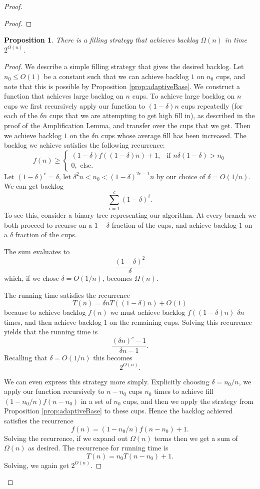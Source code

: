 \documentclass[twocolumn]{article}[10pt]
\newtheorem{proposition}{Proposition}
\begin{document}
\begin{proof}
\begin{proof}
  \end{proof}

  \begin{proposition}
    There is a filling strategy that achieves backlog $\Omega(n)$ in
    time $2^{O(n)}$.
  \end{proposition}
  \begin{proof}
  We describe a simple filling strategy that gives the desired backlog. Let
  $n_0 \le O(1)$ be a constant such that we can achieve backlog $1$ on $n_0$
  cups, and note that this is possible by Proposition \ref{prop:adaptiveBase}.
  We construct a function that achieves large backlog on $n$ cups.
  To achieve large backlog on $n$ cups we first recursively apply our function to
  $(1-\delta)n$ cups repeatedly (for each of the $\delta n$ cups that we are
  attempting to get high fill in), as described in the proof of the
  Amplification Lemma, and transfer over the cups that we get. Then we achieve backlog $1$ on
  the $\delta n$ cups whose average fill has been increased. The backlog we
  achieve satisfies the following recurrence:
  $$f(n) \ge \begin{cases}
    (1-\delta)f((1-\delta)n) + 1, & \text{if } n\delta(1-\delta) > n_0\\
    0, \text{ else.}
  \end{cases}$$
  Let $(1-\delta)^c = \delta$, let $\delta^2 n < n_0 < (1-\delta)^{2c-1} n$ by
  our choice of $\delta = O(1/n)$.
    We can get backlog 
    $$\sum_{i=1}^c (1-\delta)^i. $$
    To see this, consider a binary tree representing our algorithm. At every
    branch we both proceed to recurse on a $1-\delta$ fraction of the cups, and
    achieve backlog $1$ on a $\delta$ fraction of the cups.

    The sum evaluates to 
    $$\frac{(1-\delta)^2}{\delta}$$
    which, if we chose $\delta = O(1/n)$, becomes $\Omega(n)$.

    The running time satisfies the recurrence 
    $$T(n) = \delta n T((1-\delta)n) + O(1)$$
    because to achieve backlog $f(n)$ we must achieve backlog
    $f((1-\delta)n)$ $\delta n$ times, and then achieve backlog $1$ on the
    remaining cups. Solving this recurrence yields that the running time is
    $$\frac{(\delta n)^c - 1}{\delta n - 1}.$$
    Recalling that $\delta = O(1/n)$ this becomes 
    $$2^{O(n)}.$$

    We can even express this strategy more simply.
    Explicitly choosing $\delta = n_0/n$, we apply our function recursively to
    $n-n_0$ cups $n_0$ times to achieve fill $(1-n_0/n)f(n-n_0)$ in a set of
    $n_0$ cups, and then we apply the strategy from Proposition
    \ref{prop:adaptiveBase} to these cups. Hence the backlog achieved satisfies the recurrence
    $$f(n) = (1-n_0/n)f(n-n_0) + 1.$$
    Solving the recurrence, if we expand out $\Omega(n)$ terms then we get a sum of $\Omega(n)$ as desired.
    The recurrence for running time is 
    $$T(n) = n_0T(n-n_0)+1.$$
    Solving, we again get $2^{O(n)}$.
  \end{proof}


\end{proof}
\end{document}
